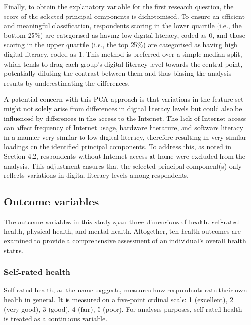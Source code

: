 Finally, to obtain the explanatory variable for the first research question, the score of the selected principal components is dichotomised. To ensure an efficient and meaningful classification, respondents scoring in the lower quartile (i.e., the bottom 25\%) are categorised as having low digital literacy, coded as 0, and those scoring in the upper quartile (i.e., the top 25\%) are categorised as having high digital literacy, coded as 1. This method is preferred over a simple median split, which tends to drag each group's digital literacy level towards the central point, potentially diluting the contrast between them and thus biasing the analysis results by underestimating the differences.

A potential concern with this PCA approach is that variations in the feature set might not solely arise from differences in digital literacy levels but could also be influenced by differences in the access to the Internet. The lack of Internet access can affect frequency of Internet usage, hardware literature, and software literacy in a manner very similar to low digital literacy, therefore resulting in very similar loadings on the identified principal components. To address this, as noted in Section 4.2, respondents without Internet access at home were excluded from the analysis. This adjustment ensures that the selected principal component(s) only reflects variations in digital literacy levels among respondents.

\subsection{Outcome variables}
The outcome variables in this study span three dimensions of health: self-rated health, physical health, and mental health. Altogether, ten health outcomes are examined to provide a comprehensive assessment of an individual's overall health status.

\subsubsection{Self-rated health}
Self-rated health, as the name suggests, measures how respondents rate their own health in general. It is measured on a five-point ordinal scale: 1 (excellent), 2 (very good), 3 (good), 4 (fair), 5 (poor). For analysis purposes, self-rated health is treated as a continuous variable.

